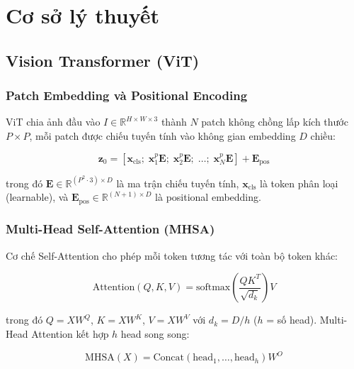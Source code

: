 \documentclass[13pt,a4paper]{article}
\newcommand{\R}{\mathbb{R}}
\begin{document}
\section{Cơ sở lý thuyết}

\subsection{Vision Transformer (ViT)}

\subsubsection{Patch Embedding và Positional Encoding}

ViT chia ảnh đầu vào $I \in \R^{H \times W \times 3}$ thành $N$ patch không chồng lấp kích thước $P \times P$, mỗi patch được chiếu tuyến tính vào không gian embedding $D$ chiều:

\begin{equation}
\mathbf{z}_0 = [\mathbf{x}_{\text{cls}};\; \mathbf{x}_1^p \mathbf{E};\; \mathbf{x}_2^p \mathbf{E};\; \ldots;\; \mathbf{x}_N^p \mathbf{E}] + \mathbf{E}_{\text{pos}}
\label{eq:patch_embed}
\end{equation}

trong đó $\mathbf{E} \in \R^{(P^2 \cdot 3) \times D}$ là ma trận chiếu tuyến tính, $\mathbf{x}_{\text{cls}}$ là token phân loại (learnable), và $\mathbf{E}_{\text{pos}} \in \R^{(N+1) \times D}$ là positional embedding.

\subsubsection{Multi-Head Self-Attention (MHSA)}

Cơ chế Self-Attention cho phép mỗi token tương tác với toàn bộ token khác:

\begin{equation}
\text{Attention}(Q, K, V) = \text{softmax}\!\left(\frac{QK^T}{\sqrt{d_k}}\right) V
\label{eq:attention}
\end{equation}

trong đó $Q = XW^Q$, $K = XW^K$, $V = XW^V$ với $d_k = D / h$ ($h$ = số head). Multi-Head Attention kết hợp $h$ head song song:

\begin{equation}
\text{MHSA}(X) = \text{Concat}(\text{head}_1, \ldots, \text{head}_h) W^O
\end{equation}
\end{document}
